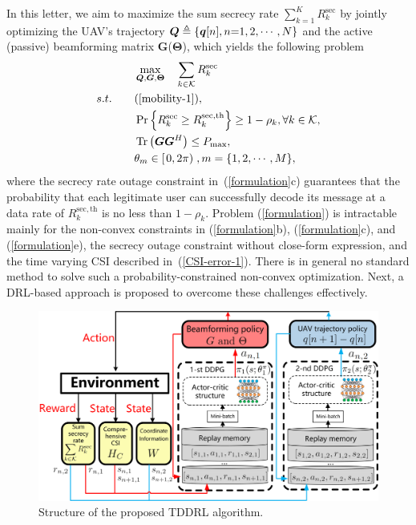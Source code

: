 \documentclass[12pt, draftclsnofoot, onecolumn]{IEEEtran}
\begin{document}
In this letter, we aim to maximize the sum secrecy rate $\sum_{k=1}^{K}  R_{k}^{\mathrm{sec}} $ by jointly optimizing the UAV's trajectory ${\bm{Q}} \triangleq\{{\bm q }[n], n {\rm =}{1,2,\cdots,N}\}$ and the active (passive) beamforming matrix $\bm{G}$($\bm{\Theta}$), which yields the following problem
\begin{subequations}\label{formulation}
  \begin{align}
    &\mathop {\max }\limits_{{\bm{Q}},{\bm{G}},{\bm{\Theta }}} \quad\sum\limits_{k \in {\cal K}} {{R_k^{\mathrm{sec}}}}\\
    s.t.\qquad &(\ref{mobility-1}),\\
    &\operatorname{Pr}\left\{{R_k^{\mathrm{sec}}} \geq R_{k}^{\mathrm{sec,th}}\right\} \geq 1-\rho_{k}, \forall k \in \mathcal{K},\\
    &\operatorname{Tr}\left(\bm{G} \bm{G}^{H}\right) \leq P_{\max },\\
    &{\theta _m} \in \left[ {\left. {0,2\pi } \right)} \right. , m = \{1,2,\cdots, M\},
  \end{align}
\end{subequations}
where the secrecy rate outage constraint in~(\ref{formulation}\rm{c}) guarantees that the probability that each legitimate user can successfully decode its message at a data rate of $ R_{k}^{\mathrm{sec,th}}$ is no less than $1-\rho_k$. Problem (\ref{formulation}) is intractable mainly for the non-convex constraints in (\ref{formulation}b), (\ref{formulation}c), and (\ref{formulation}e), the secrecy outage constraint without close-form expression, and the time varying CSI described in~(\ref{CSI-error-1}). There is in general no standard method to solve such a probability-constrained non-convex optimization. Next, a DRL-based approach is proposed to overcome these challenges effectively.
\begin{figure}[t]
	\centering
	\includegraphics[width=0.8\linewidth]{./plot/eps/construction_v2.eps}%
	\caption{Structure of the proposed TDDRL algorithm.}  \label{structure}
\end{figure}
\end{document}
